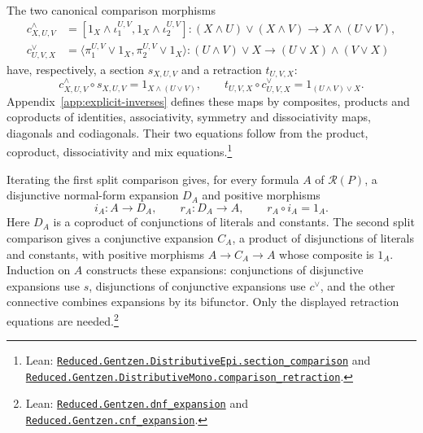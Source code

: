 \documentclass[11pt]{article}
\begin{document}
The two canonical comparison morphisms
\[
 \begin{aligned}
 c^\wedge_{X,U,V}
 &=[1_X\wedge\iota_1^{U,V},1_X\wedge\iota_2^{U,V}]
 :(X\wedge U)\vee(X\wedge V)\longrightarrow X\wedge(U\vee V),\\
 c^\vee_{U,V,X}
 &=\langle\pi_1^{U,V}\vee1_X,\pi_2^{U,V}\vee1_X\rangle
 :(U\wedge V)\vee X\longrightarrow(U\vee X)\wedge(V\vee X)
 \end{aligned}
\]
have, respectively, a section $s_{X,U,V}$ and a retraction
$t_{U,V,X}$:
\[
 c^\wedge_{X,U,V}\circ s_{X,U,V}=1_{X\wedge(U\vee V)},\qquad
 t_{U,V,X}\circ c^\vee_{U,V,X}=1_{(U\wedge V)\vee X}.
\]
Appendix~\ref{app:explicit-inverses} defines these maps by
composites, products and coproducts of identities, associativity,
symmetry and dissociativity maps, diagonals and codiagonals.
Their two equations follow from the
product, coproduct, dissociativity and mix equations.\footnote{\raggedright Lean:
\href{https://github.com/flengyel/Dosen-Petric-Maximality/blob/dosen-petric-v25-palomar-v3/DosenPetric/GentzenDistributiveEpi.lean\#L57}{\texttt{Reduced.Gentzen.DistributiveEpi.\allowbreak{}section\_comparison}}
and
\href{https://github.com/flengyel/Dosen-Petric-Maximality/blob/dosen-petric-v25-palomar-v3/DosenPetric/GentzenDistributiveMono.lean\#L54}{\texttt{Reduced.Gentzen.DistributiveMono.\allowbreak{}comparison\_retraction}}.}

Iterating the first split comparison gives, for every formula $A$
of $\mathcal R(P)$, a disjunctive normal-form expansion $D_A$
and positive morphisms
\[
 i_A:A\longrightarrow D_A,\qquad r_A:D_A\longrightarrow A,
 \qquad r_A\circ i_A=1_A.
\]
Here $D_A$ is a coproduct of conjunctions of literals and constants.
The second split comparison gives a conjunctive expansion $C_A$,
a product of disjunctions of literals and constants, with positive
morphisms $A\to C_A\to A$ whose composite is $1_A$.
Induction on $A$ constructs these expansions: conjunctions of
disjunctive expansions use $s$, disjunctions of conjunctive
expansions use $c^\vee$, and the other connective combines
expansions by its bifunctor.
Only the displayed retraction equations are needed.\footnote{\raggedright Lean:
\href{https://github.com/flengyel/Dosen-Petric-Maximality/blob/dosen-petric-v25-palomar-v3/DosenPetric/GentzenNormalExpansion.lean\#L45}{\texttt{Reduced.Gentzen.\allowbreak{}dnf\_expansion}} and
\href{https://github.com/flengyel/Dosen-Petric-Maximality/blob/dosen-petric-v25-palomar-v3/DosenPetric/GentzenNormalExpansion.lean\#L62}{\texttt{Reduced.Gentzen.\allowbreak{}cnf\_expansion}}.}
\end{document}
